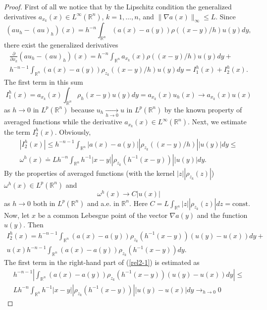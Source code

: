 \documentclass[10pt,a4paper]{amsart}
\numberwithin{equation}{section}
\newcommand{\R}{{\mathbb R}}
\newcommand{\const}{\mathrm{const}}
\begin{document}
\begin{proof}
First of all we notice that by the Lipschitz condition the generalized derivatives $a_{x_k}(x)\in L^\infty(\R^n)$, $k=1,\dots,n$, and $\|\nabla a(x)\|_\infty\le L$. Since \[(au_h-(au)_h)(x)=h^{-n}\int_{\R^n}(a(x)-a(y))\rho((x-y)/h) u(y)dy,\]
there exist the generalized derivatives
\begin{align}\label{rel}
\frac{\partial}{\partial x_k}(au_h-(au)_h)(x)=h^{-n}\int_{\R^n}a_{x_k}(x)\rho((x-y)/h) u(y)dy+\nonumber\\ h^{-n-1}\int_{\R^n}(a(x)-a(y))\rho_{z_k}((x-y)/h) u(y)dy=I_1^h(x)+I_2^h(x).
\end{align}
The first term in this sum
\begin{equation}\label{rel1}
I_1^h(x)=a_{x_k}(x)\int_{\R^n}\rho_h(x-y) u(y)dy=a_{x_k}(x)u_h(x)\to a_{x_k}(x)u(x)
\end{equation}
as $h\to 0$ in $L^p(\R^n)$ because $u_h\mathop{\to}\limits_{h\to 0} u$ in $L^p(\R^n)$ by the known property of averaged functions while the derivative $a_{x_k}(x)\in L^\infty(\R^n)$.
Next, we estimate the term $I_2^h(x)$. Obviously,
\begin{align}\label{es1}
|I_2^h(x)|\le h^{-n-1}\int_{\R^n}|a(x)-a(y)||\rho_{z_k}((x-y)/h)| |u(y)|dy\le \nonumber\\ \omega^h(x)\doteq Lh^{-n}\int_{\R^n} h^{-1}|x-y||\rho_{z_k}(h^{-1}(x-y))| |u(y)|dy.
\end{align}
By the properties of averaged functions (with the kernel $|z||\rho_{z_k}(z)|$) $\omega^h(x)\in L^p(\R^n)$ and
\begin{equation}\label{rel2}
\omega^h(x)\to C|u(x)|
\end{equation}
as $h\to 0$ both in $L^p(\R^n)$ and a.e. in $\R^n$. Here $\displaystyle C=L\int_{\R^n} |z||\rho_{z_k}(z)|dz=\const$.
Now, let $x$ be a common Lebesgue point of the vector $\nabla a(y)$ and the function $u(y)$. Then
\begin{align}\label{rel2-1}
I_2^h(x)=h^{-n-1}\int_{\R^n}(a(x)-a(y))\rho_{z_k}(h^{-1}(x-y))(u(y)-u(x))dy+\nonumber\\ u(x)h^{-n-1}\int_{\R^n}(a(x)-a(y))\rho_{z_k}(h^{-1}(x-y))dy.
\end{align}
The first term in the right-hand part of (\ref{rel2-1}) is estimated as
\begin{align}\label{est2-1}
h^{-n-1}\left|\int_{\R^n}(a(x)-a(y))\rho_{z_k}(h^{-1}(x-y))(u(y)-u(x))dy\right|\le \nonumber\\
Lh^{-n}\int_{\R^n}h^{-1}|x-y||\rho_{z_k}(h^{-1}(x-y))||u(y)-u(x)|dy\mathop{\to}_{h\to 0} 0

\end{align}
\end{proof}
\end{document}
